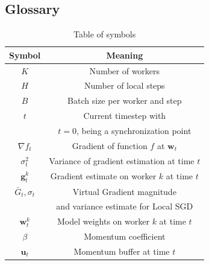 \documentclass[10pt,twocolumn,letterpaper]{article}
\begin{document}
\subsection{Glossary}
\begin{table}[h]
\centering
\begin{tabular}{c c}
\hline Symbol & Meaning \\
\hline$K$ & Number of workers \\
$H$ & Number of local steps \\
$B$ & Batch size per worker and step \\
$t$ & Current timestep with\\&$t=0$, being a synchronization point \\
$\nabla f_t$ & Gradient of function $f$ at $\mathbf{w}_t$ \\
$\sigma_t^2$ & Variance of gradient estimation at time $t$ \\
$\mathbf{g}_t^k$ & Gradient estimate on worker $k$ at time $t$ \\
$\bar{G}_t, \sigma_t$ & Virtual Gradient magnitude \\ &and variance estimate for Local SGD \\
$\mathbf{w}_t^k$ & Model weights on worker $k$ at time $t$ \\
$\beta$ & Momentum coefficient \\
$\mathbf{u}_t$ & Momentum buffer at time $t$\\
\hline
\end{tabular}
\caption{Table of symbols}
\end{table}
\end{document}
